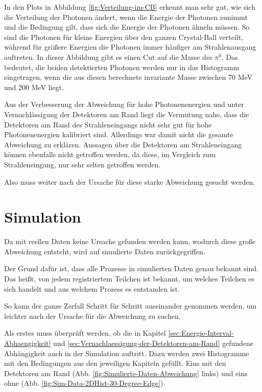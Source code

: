 \documentclass[a4paper,11pt,oneside,final,german,openbib,pdftex]{scrbook}
\begin{document}
{In den Plots in Abbildung \ref{fig:Verteilung-im-CB} erkennt man sehr gut, wie sich die Verteilung der Photonen \"andert, wenn die Energie der Photonen zunimmt und die Bedingung gilt, dass sich die Energie der Photonen \"ahneln m\"ussen. So sind die Photonen f\"ur kleine Energien \"uber den ganzen Crystal-Ball verteilt, w\"ahrend f\"ur gr\"o{\ss}ere Energien die Photonen immer h\"aufiger am Strahlenausgang auftreten. In dieser Abbildung gibt es einen Cut auf die Masse des $\pi^0$. Das bedeutet, die beiden detektierten Photonen werden nur in das Histogramm eingetragen, wenn die aus diesen berechnete invariante Masse zwischen 70 MeV und 200 MeV liegt.

Aus der Verbesserung der Abweichung f\"ur hohe Photonenenergien und unter Vernachl\"assigung der Detektoren am Rand liegt die Vermutung nahe, dass die Detektoren am Rand des Strahleneingangs nicht sehr gut f\"ur hohe Photonenenergien kalibriert sind. 
Allerdings war damit nicht die gesamte Abweichung zu erkl\"aren. 
Aussagen \"uber die Detektoren am Strahleneingang k\"onnen ebenfalls nicht getroffen werden, da diese, im Vergleich zum Strahleneingang, nur sehr selten getroffen werden.

Also muss weiter nach der Ursache f\"ur diese starke Abweichung gesucht werden.



\section{Simulation}
\label{sec:Simulation}

Da mit reellen Daten keine Ursache gefunden werden kann, wodurch diese gro{\ss}e Abweichung entsteht, wird auf simulierte Daten zur\"uckgegriffen. 

Der Grund daf\"ur ist, dass alle Prozesse in simulierten Daten genau bekannt sind. Das hei{\ss}t, von jedem registriertem Teilchen ist bekannt, um welches Teilchen es sich handelt und aus welchem Prozess es entstanden ist. 

So kann der ganze Zerfall Schritt f\"ur Schritt auseinander genommen werden, um leichter nach der Ursache f\"ur die Abweichung zu suchen.

Als erstes muss \"uberpr\"uft werden, ob die in Kapitel \ref{sec:Energie-Interval-Abhaengigkeit} und \ref{sec:Vernachlaessigung-der-Detektoren-am-Rand} gefundene Abh\"angigkeit auch in der Simulation auftritt. 
Dazu werden zwei Histogramme mit den Bedingungen aus den jeweiligen Kapiteln gef\"ullt. Eins mit den Detektoren am Rand (Abb. \ref{fig:Simulierte-Daten-Abweichung} links) und eins ohne (Abb. \ref{fig:Sim-Data-2DHist-30-Degree-Edge}).

}
\end{document}
